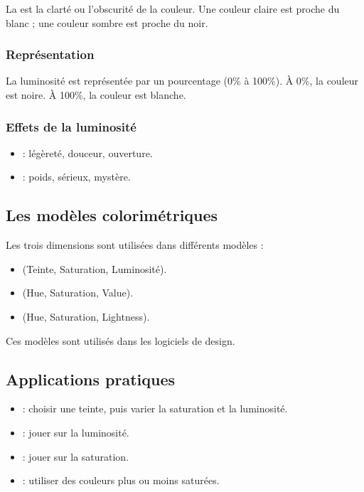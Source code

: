 La  est la clarté ou l'obscurité de la couleur. Une couleur claire est proche du blanc ; une couleur sombre est proche du noir.

\subsubsection{Représentation}

La luminosité est représentée par un pourcentage (0\% à 100\%). À 0\%, la couleur est noire. À 100\%, la couleur est blanche.

\subsubsection{Effets de la luminosité}

\begin{itemize}
    \item {} : légèreté, douceur, ouverture.
    \item {} : poids, sérieux, mystère.
\end{itemize}

\subsection{Les modèles colorimétriques}

Les trois dimensions sont utilisées dans différents modèles :

\begin{itemize}
    \item {} (Teinte, Saturation, Luminosité).
    \item {} (Hue, Saturation, Value).
    \item {} (Hue, Saturation, Lightness).
\end{itemize}

Ces modèles sont utilisés dans les logiciels de design.

\subsection{Applications pratiques}

\begin{itemize}
    \item {} : choisir une teinte, puis varier la saturation et la luminosité.
    \item {} : jouer sur la luminosité.
    \item {} : jouer sur la saturation.
    \item {} : utiliser des couleurs plus ou moins saturées.
\end{itemize}

